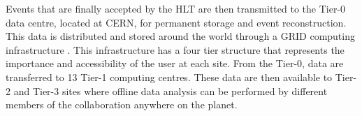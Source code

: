 Events that are finally accepted by the \ac{HLT} are then transmitted
to the Tier-0 data centre, located at CERN, for permanent storage and
event reconstruction. This data is distributed and stored around the
world through a GRID computing infrastructure \cite{Bayatyan:838359}.
This infrastructure has a four tier structure that represents the importance
and accessibility of the user at each site. From the Tier-0, data are
transferred to 13 Tier-1 computing centres. These data are then
available to Tier-2 and Tier-3 sites where offline data analysis can be
performed by different members of the \CMS collaboration anywhere on
the planet.

